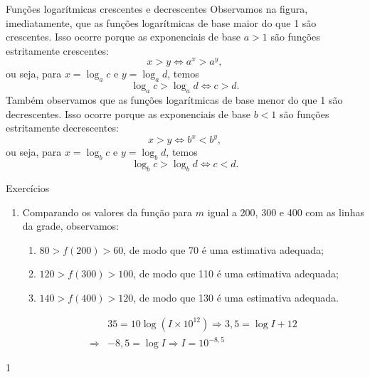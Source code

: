 \begin{observation}{Funções logarítmicas crescentes e decrescentes}
Observamos na figura, imediatamente, que as funções logarítmicas de base maior do que 1 são crescentes. Isso ocorre porque as exponenciais de base $a>1$ são funções estritamente crescentes:
$$
x > y \Longleftrightarrow a^x > a^y,
$$
ou seja, para $x=\log_a c$ e $y=\log_a d$, temos
$$
\log_a c > \log_a d \Longleftrightarrow c > d.
$$
Também observamos que as funções logarítmicas de base menor do que 1 são decrescentes. Isso ocorre porque as exponenciais de base $b<1$ são funções estritamente decrescentes:
$$
x > y \Longleftrightarrow b^x < b^y,
$$
ou seja, para $x=\log_b c$ e $y=\log_b d$, temos
$$
\log_b c > \log_b d \Longleftrightarrow c < d.
$$


\end{observation}
\clearpage
\def\currentcolor{cor1}
\marginpar{\vspace{.5em}}
\begin{answer}{Exercícios}
{
	\exerciselist
	\begin{enumerate}
	\item Comparando os valores da função para $m$ igual a 200, 300 e 400 com as linhas da grade, observamos:
	\begin{enumerate}
	\item $80>f(200)>60$, de modo que 70 é uma estimativa adequada;
	\item $120>f(300)>100$, de modo que 110 é uma estimativa adequada;
	\item $140>f(400)>120$, de modo que 130 é uma estimativa adequada.
	\end{enumerate}

	\Item 
	\begin{align*}
	& 35 = 10 \log(I \times 10^{12}) \Rightarrow   3{,}5 = \log I + 12\\
	\Rightarrow & -8{,}5 = \log I \Rightarrow I = 10^{-8{,}5}
	\end{align*}
	\end{enumerate}
}{1}
\end{answer}
\clearmargin

